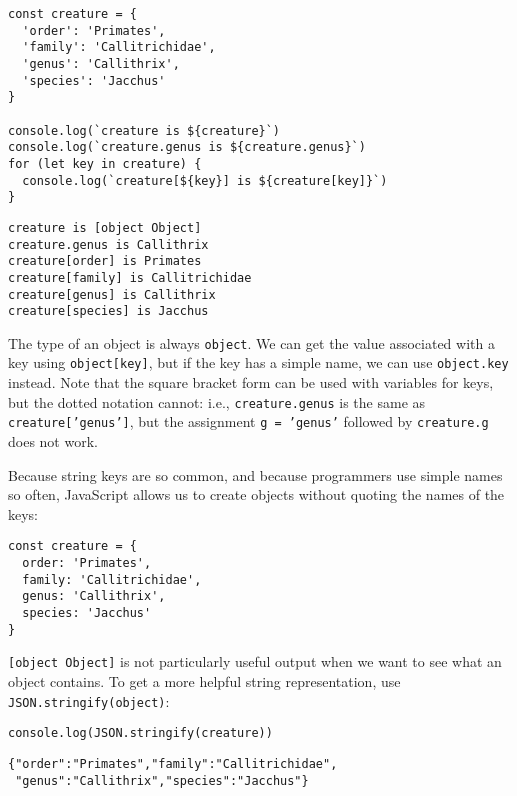 
\begin{verbatim}
const creature = {
  'order': 'Primates',
  'family': 'Callitrichidae',
  'genus': 'Callithrix',
  'species': 'Jacchus'
}

console.log(`creature is ${creature}`)
console.log(`creature.genus is ${creature.genus}`)
for (let key in creature) {
  console.log(`creature[${key}] is ${creature[key]}`)
}
\end{verbatim}

\begin{verbatim}
creature is [object Object]
creature.genus is Callithrix
creature[order] is Primates
creature[family] is Callitrichidae
creature[genus] is Callithrix
creature[species] is Jacchus
\end{verbatim}

The type of an object is always \texttt{object}.
We can get the value associated with a key using \texttt{object[key]},
but if the key has a simple name,
we can use \texttt{object.key} instead.
Note that the square bracket form can be used with variables for keys,
but the dotted notation cannot:
i.e.,
\texttt{creature.genus} is the same as \texttt{creature['genus']},
but the assignment \texttt{g\ =\ 'genus'} followed by \texttt{creature.g} does not work.

Because string keys are so common,
and because programmers use simple names so often,
JavaScript allows us to create objects without quoting the names of the keys:

\begin{verbatim}
const creature = {
  order: 'Primates',
  family: 'Callitrichidae',
  genus: 'Callithrix',
  species: 'Jacchus'
}
\end{verbatim}

\texttt{[object\ Object]} is not particularly useful output when we want to see what an object contains.
To get a more helpful string representation,
use \texttt{JSON.stringify(object)}:

\begin{verbatim}
console.log(JSON.stringify(creature))
\end{verbatim}

\begin{verbatim}
{"order":"Primates","family":"Callitrichidae",
 "genus":"Callithrix","species":"Jacchus"}
\end{verbatim}

